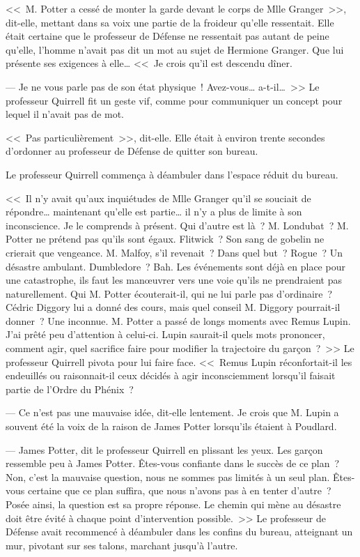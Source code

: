 <<~M. Potter a cessé de monter la garde devant le corps de Mlle Granger~>>, dit-elle, mettant dans sa voix une partie de la froideur qu'elle ressentait. Elle était certaine que le professeur de Défense ne ressentait pas autant de peine qu'elle, l'homme n'avait pas dit un mot au sujet de Hermione Granger. Que lui présente ses exigences à elle… <<~Je crois qu'il est descendu dîner.

--- Je ne vous parle pas de son état physique~! Avez-vous… a-t-il…~>> Le professeur Quirrell fit un geste vif, comme pour communiquer un concept pour lequel il n'avait pas de mot.

<<~Pas particulièrement~>>, dit-elle. Elle était à environ trente secondes d'ordonner au professeur de Défense de quitter son bureau.

Le professeur Quirrell commença à déambuler dans l'espace réduit du bureau.

<<~Il n'y avait qu'aux inquiétudes de Mlle Granger qu'il se souciait de répondre… maintenant qu'elle est partie… il n'y a plus de limite à son inconscience. Je le comprends à présent. Qui d'autre est là~? M. Londubat~? M. Potter ne prétend pas qu'ils sont égaux. Flitwick~? Son sang de gobelin ne crierait que vengeance. M. Malfoy, s'il revenait~? Dans quel but~? Rogue~? Un désastre ambulant. Dumbledore~? Bah. Les événements sont déjà en place pour une catastrophe, ils faut les manœuvrer vers une voie qu'ils ne prendraient pas naturellement. Qui M. Potter écouterait-il, qui ne lui parle pas d'ordinaire~? Cédric Diggory lui a donné des cours, mais quel conseil M. Diggory pourrait-il donner~? Une inconnue. M. Potter a passé de longs moments avec Remus Lupin. J'ai prêté peu d'attention à celui-ci. Lupin saurait-il quels mots prononcer, comment agir, quel sacrifice faire pour modifier la trajectoire du garçon~?~>> Le professeur Quirrell pivota pour lui faire face. <<~Remus Lupin réconfortait-il les endeuillés ou raisonnait-il ceux décidés à agir inconsciemment lorsqu'il faisait partie de l'Ordre du Phénix~?

--- Ce n'est pas une mauvaise idée, dit-elle lentement. Je crois que M. Lupin a souvent été la voix de la raison de James Potter lorsqu'ils étaient à Poudlard.

--- James Potter, dit le professeur Quirrell en plissant les yeux. Les garçon ressemble peu à James Potter. Êtes-vous confiante dans le succès de ce plan~? Non, c'est la mauvaise question, nous ne sommes pas limités à un seul plan. Êtes-vous certaine que ce plan suffira, que nous n'avons pas à en tenter d'autre~? Posée ainsi, la question est sa propre réponse. Le chemin qui mène au désastre doit être évité à chaque point d'intervention possible.~>> Le professeur de Défense avait recommencé à déambuler dans les confins du bureau, atteignant un mur, pivotant sur ses talons, marchant jusqu'à l'autre.

